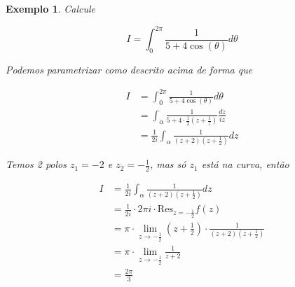 \documentclass{article}
\newtheorem{ex}{Exemplo}
\begin{document}
\begin{ex}
Calcule

\begin{equation*}
    I = \int_0^{2 \pi} \frac{1}{5 + 4 \cos(\theta)} d \theta
\end{equation*}

Podemos parametrizar como descrito acima de forma que

\begin{align*}
    I &= \int_0^{2 \pi} \frac{1}{5 + 4 \cos(\theta)} d \theta \\
    &= \int_\alpha \frac{1}{5 + 4 \cdot \frac{1}{2} (z + \frac{1}{z})} \frac{d z}{i z} \\
    &= \frac{1}{2 i} \int_\alpha \frac{1}{(z + 2) (z + \frac{1}{2})} d z
\end{align*}

Temos 2 polos $z_1 = -2$ e $z_2 = - \frac{1}{2}$, mas só $z_1$ está na curva, então

\begin{align*}
    I &= \frac{1}{2 i} \int_\alpha \frac{1}{(z + 2) (z + \frac{1}{2})} d z \\
    &= \frac{1}{2 i} \cdot 2 \pi i \cdot \mathrm{Res}_{z = - \frac{1}{2}} f(z) \\
    &= \pi \cdot \lim_{z \to - \frac{1}{2}} \left(z + \frac{1}{2} \right) \cdot \frac{1}{(z + 2) (z + \frac{1}{2})} \\
    &= \pi \cdot \lim_{z \to - \frac{1}{2}} \frac{1}{z + 2} \\
    &= \frac{2 \pi}{3}
\end{align*}
\end{ex}
\end{document}

